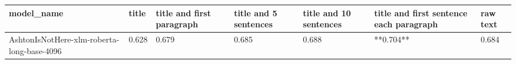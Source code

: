 \begin{tabular}{lllllll}
\toprule
                                model\_name & title & title and first paragraph & title and 5 sentences & title and 10 sentences & title and first sentence each paragraph & raw text \\
\midrule
AshtonIsNotHere-xlm-roberta-long-base-4096 & 0.628 &                     0.679 &                 0.685 &                  0.688 &                               **0.704** &    0.684 \\
\bottomrule
\end{tabular}
